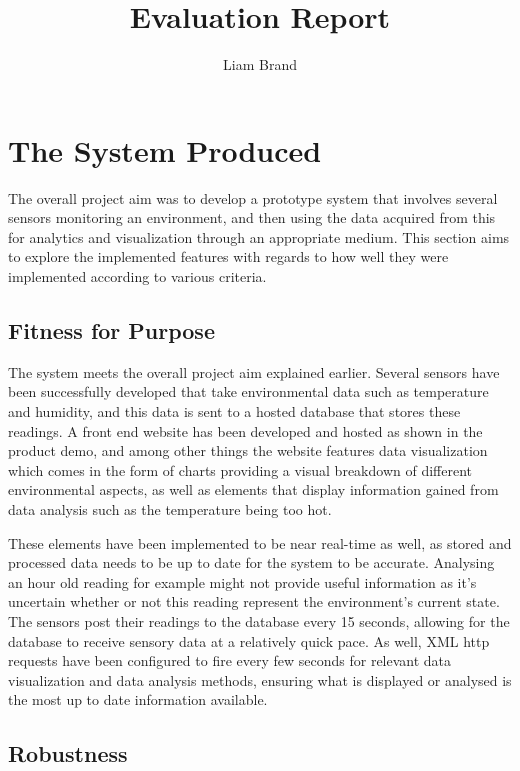 \documentclass[]{report}
\title{Evaluation Report}
\author{Liam Brand}
\date{}
\begin{document}
\maketitle

\section{The System Produced}
The overall project aim was to develop a prototype system that involves several sensors monitoring an environment, and then using the data acquired from this for analytics and visualization through an appropriate medium. This section aims to explore the implemented features with regards to how well they were implemented according to various criteria.

	\subsection{Fitness for Purpose}
	The system meets the overall project aim explained earlier. Several sensors have been successfully developed that take environmental data such as temperature and humidity, and this data is sent to a hosted database that stores these readings. A front end website has been developed and hosted as shown in the product demo, and among other things the website features data visualization which comes in the form of charts providing a visual breakdown of different environmental aspects, as well as elements that display information gained from data analysis such as the temperature being too hot.
	
	These elements have been implemented to be near real-time as well, as stored and processed data needs to be up to date for the system to be accurate. Analysing an hour old reading for example might not provide useful information as it's uncertain whether or not this reading represent the environment's current state. The sensors post their readings to the database every 15 seconds, allowing for the database to receive sensory data at a relatively quick pace. As well, XML http requests have been configured to fire every few seconds for relevant data visualization and data analysis methods, ensuring what is displayed or analysed is the most up to date information available.
	
	\subsection{Robustness}
	
	
	
\end{document}
